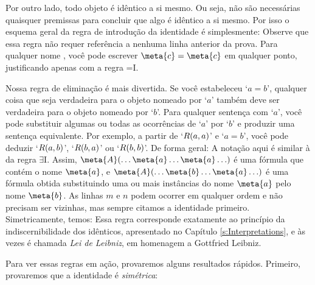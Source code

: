 Por outro lado, todo objeto é idêntico a si mesmo. Ou seja, não são necessárias quaisquer premissas para concluir que algo é idêntico a si mesmo. Por isso o esquema geral da regra de introdução da identidade é simplesmente:
Observe que essa regra não requer referência a nenhuma linha anterior da prova. Para qualquer nome , você pode escrever $\meta{c}=\meta{c}$ em qualquer ponto, justificando apenas com a regra  {=}I.
 
Nossa regra de eliminação é mais divertida. Se você estabeleceu `$a=b$',  qualquer coisa que seja verdadeira para o objeto nomeado por `$a$' também deve ser verdadeira para o objeto nomeado por `$b$'. Para qualquer sentença com `$a$', você pode substituir algumas ou todas as ocorrências de `$a$' por `$b$' e produzir uma sentença equivalente. Por exemplo,  a partir de `$\mathord{R}(a,a)$' e `$a = b$',  você pode deduzir `$\mathord{R}(a,b)$', `$\mathord{R}(b,a)$' ou `$\mathord{R}(b,b)$'. De forma geral:
A notação aqui é similar à da regra $\exists$I. Assim, $\meta{A}(\ldots \meta{a} \ldots \meta{a}\ldots)$ é uma fórmula que contém o nome $\meta{a}$, e $\meta{A}(\ldots \meta{b} \ldots \meta{a}\ldots)$ é uma fórmula obtida substituindo uma ou mais instâncias do nome $\meta{a}$ pelo nome $\meta{b}$. As linhas $m$ e $n$ podem ocorrer em qualquer ordem e não precisam ser vizinhas, mas sempre citamos a identidade primeiro. Simetricamente, temos:
Essa regra corresponde exatamente ao princípio da indiscernibilidade dos idênticos, apresentado no Capítulo \ref{s:Interpretations}, e às vezes é chamada  \emph{Lei de Leibniz}, em homenagem a Gottfried Leibniz. 

Para ver essas regras em ação, provaremos alguns resultados rápidos. Primeiro, provaremos que a identidade é  \emph{simétrica}:

